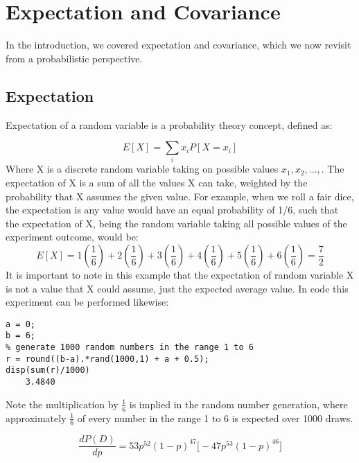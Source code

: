 \section{Expectation and Covariance}

In the introduction, we covered expectation and covariance, which we now revisit from a probabilistic perspective. 

\subsection{Expectation}

Expectation of a random variable is a probability theory concept, defined as:

\begin{equation}
E[X] = \sum_i x_i P[X=x_i] \label{Expectation}
\end{equation}
Where X is a discrete random variable taking on possible values $x_1,x_2,...,$. The expectation of X is a sum of all the values X can take, weighted by the probability that X assumes the given value. For example, when we roll a fair dice, the expectation is any value would have an equal probability of 1/6, such that the expectation of X, being the random variable taking all possible values of the experiment outcome, would be:
$$
    E[X]=1(\frac{1}{6}) + 2(\frac{1}{6}) + 3(\frac{1}{6}) + 4(\frac{1}{6}) + 5(\frac{1}{6}) + 6(\frac{1}{6})=\frac{7}{2}
$$
It is important to note in this example that the expectation of random variable X is not a value that X could assume, just the expected average value. In code this experiment can be performed likewise:
\begin{verbatim}
a = 0;
b = 6;
% generate 1000 random numbers in the range 1 to 6
r = round((b-a).*rand(1000,1) + a + 0.5);
disp(sum(r)/1000)
    3.4840
\end{verbatim}
Note the multiplication by $\frac{1}{6}$ is implied in the random number generation, where approximately $\frac{1}{6}$ of every number in the range 1 to 6 is expected over 1000 draws.

$$
\frac{dP(D)}{dp}=53p^{52}(1-p)^{47}\big[-47p^{53}(1-p)^{46}\big]
$$



